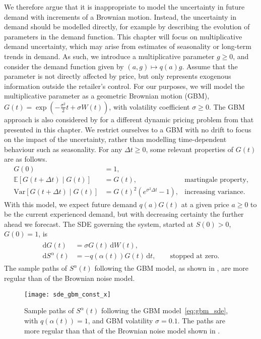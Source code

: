 \documentclass[main.tex]{subfiles}
\begin{document}
We therefore argue that it is inappropriate to model the uncertainty
in future demand with increments of a Brownian motion. Instead, the
uncertainty in demand should be modelled directly,
for example by describing the evolution of parameters in the
demand function.
This chapter will focus on multiplicative demand
uncertainty, which may arise from estimates of seasonality or
long-term trends in demand. As such, we introduce a multiplicative
parameter $g\geq 0$, and consider the demand function given by
$(a,g)\mapsto q(a)g$. Assume that the parameter is not directly
affected by price, but  only represents exogenous information outside the
retailer's control.
For our purposes, we will model the multiplicative parameter as
a geometric Brownian motion (GBM), $G(t) = \exp\left(
  -\frac{\sigma^2}{2}t +\sigma W(t)\right)$, with volatility coefficient
$\sigma\geq 0$. The GBM approach is also considered
by \citet{xu2006monopolistic} for a different dynamic pricing problem from
that presented in this chapter.
We restrict ourselves to a GBM with no
drift to focus on the impact of the uncertainty, rather than modelling
time-dependent behaviour such as seasonality.
For any $\Delta t\geq 0$, some relevant properties of $G(t)$ are as follows.
\begin{align}
  G(0)&=1,\\
  \mathbb E[G(t+\Delta t)\mid G(t)]&=G(t),
                                   &\text{martingale property,}\\
  \mbox{Var}[G(t+\Delta t)\mid G(t)]&={G(t)}^2(e^{\sigma^2 \Delta
                                      t}-1), & \text{increasing variance.}
\end{align}
With this model, we expect future demand $q(a)G(t)$ at a given price $a\geq
0$ to be the current experienced demand, but with decreasing certainty
the further ahead we forecast.
The SDE governing the system, started at
$S(0)>0$, $G(0)=1$, is
\begin{align}
  \begin{split}\label{eq:gbm_sde}
    \mathrm{d}G(t)&=\sigma G(t)\,\mathrm{d}W(t),\\
    \mathrm{d}S^\alpha(t)&=-q(\alpha(t))G(t)\,\mathrm{d}t,\qquad\text{stopped at zero}.
  \end{split}
\end{align}
The sample paths of $S^\alpha(t)$ following the GBM model, as shown in
, are more regular
than of the Brownian noise model.
\begin{figure}[htbp]
  \centering
  \texttt{[image: sde\_gbm\_const\_x]}
  \caption{Sample paths of $S^\alpha(t)$ following the GBM
    model~\eqref{eq:gbm_sde}, with $q(\alpha(t))=1$, and GBM volatility
    $\sigma = 0.1$. The paths are  more regular than that of the
    Brownian noise model shown in .
  }\label{fig:sde_gbm_const_x}
\end{figure}
\end{document}

